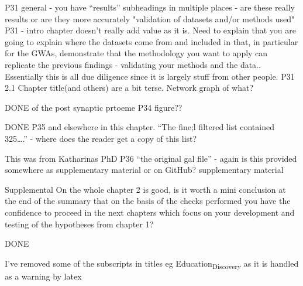 P31 general - you have “results” subheadings in multiple places - are these really results or are they more accurately  "validation of datasets and/or methods used"
P31 - intro chapter doesn’t really add value as it is. Need to explain that you are going to explain where the datasets come from and included in that, in particular for the GWAs, demonstrate that the methodology you want to apply can replicate the previous findings - validating your methods and the data.. Essentially this is all due diligence since it is largely stuff from other people.
P31 2.1 Chapter title(and others) are a bit terse. Network graph of what?

DONE of the post synaptic prtoeme
P34 figure??

DONE
P35 and elsewhere in this chapter. “The fine;l filtered list contained 325….” - where does the reader get a copy of this list?

This was from Katharinas PhD
P36 “the original gal file” - again is this provided somewhere as supplementary material or on GitHub? supplementary material

Supplemental
On the whole chapter 2 is good, is it worth a mini conclusion at the end of the summary that on the basis of the checks performed you have the confidence to proceed in the next chapters which focus on your development and testing of the hypotheses from chapter 1?

DONE

I've removed some of the subscripts in titles eg Education\textsubscript{Discovery} as it is handled as a warning by latex 